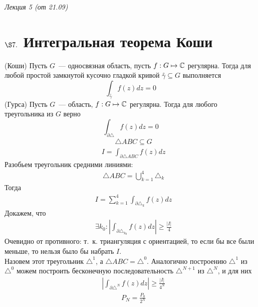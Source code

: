 \begin{flushright}
    \textit{Лекция 5 (от 21.09)}
\end{flushright}
\section{$\S 7.$ Интегральная теорема Коши}
\theorem (Коши)
Пусть $G$~--- односвязная область, пусть $f: G \mapsto \mathbb{C}$
регулярна. Тогда для любой простой замкнутой кусочно гладкой кривой
$\overset{\circ}{\gamma} \subseteq G$ выполняется
\begin{equation} \label{(7.1)}
  \int_{\overset{\circ}{\gamma}}f(z)dz = 0
\end{equation}
\lemma (Гурса)
Пусть $G$~--- область, $f: G \mapsto \mathbb{C}$ регулярна. Тогда для
любого треугольника из $G$ верно
\begin{equation} \label{(7.2)}
  \int_{\partial \triangle} f(z) dz = 0
\end{equation}
\pr
\begin{align*}
  & \triangle ABC \subseteq G
\end{align*}
\begin{align*}
  & I = \int_{\partial \triangle ABC}f(z)dz
\end{align*}
Разобьем треугольник средними линиями:
\begin{align*}
  & \triangle ABC = \bigcup_{k=1}^{4}\triangle_k
\end{align*}
Тогда
\begin{align*}
  & I = \sum_{k=1}^4\int_{\partial \triangle_k}f(z)dz
\end{align*}
Докажем, что
\begin{align*}
  & \exists k_0: \left| \int_{\partial \triangle_{k_0}} f(z)dz\right|\geq\frac{\left| I \right|}{4}
\end{align*}
Очевидно от противного: т.~к. триангуляция с ориентацией, то если бы все были
меньше, то нельзя было бы набрать $I$.
\\
Назовем этот треугольник $\triangle^1$, а $\triangle ABC = \triangle^0$.
Аналогично построению $\triangle^1$ из $\triangle^0$ можем построить
бесконечную последовательность $\triangle^{N+1}$ из $\triangle^N$, и для них
\begin{align*}
  & \left| \int_{\partial \triangle^N} f(z)dz\right|\geq\frac{\left| I \right|}{4^N}
\end{align*}
\begin{align*}
  & P_N = \frac{P_0}{2^N}
\end{align*}
